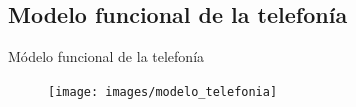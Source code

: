 \documentclass{beamer}
\begin{document}



\subsection{Modelo funcional de la telefonía}
\label{sec:modelo-funcional-de}

\begin{frame}{Módelo funcional de la telefonía}
  \begin{figure}[!h]
    \centering
    \texttt{[image: images/modelo\_telefonia]}
  \end{figure}
  
\end{frame}
\end{document}
